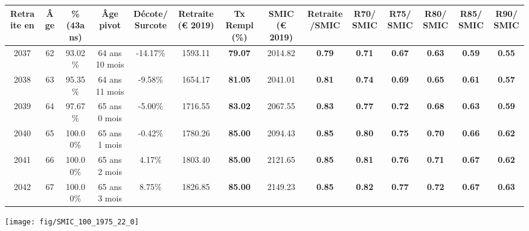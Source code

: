 \begin{adjustbox}{max width=\textwidth} 
\begin{tabular}[htb]{|c|c||c|c|c||c|c||c|c||c|c|c|c|c|} 
\hline 
 Retraite en &  Âge &  \%(43ans) &  Âge pivot &  Décote/Surcote &  Retraite (\euro{} 2019) &  Tx Rempl(\%) &  SMIC (\euro{} 2019) &  Retraite/SMIC &  R70/SMIC &  R75/SMIC &  R80/SMIC &  R85/SMIC &  R90/SMIC \\ 
\hline \hline 
 2037 &  62 &  93.02\% &  64 ans 10 mois &  -14.17\% &  1593.11 &  {\bf 79.07} &  2014.82 &  {\bf {\color{red} 0.79}} &  {\bf {\color{red} 0.71}} &  {\bf {\color{red} 0.67}} &  {\bf {\color{red} 0.63}} &  {\bf {\color{red} 0.59}} &  {\bf {\color{red} 0.55}} \\ 
\hline 
 2038 &  63 &  95.35\% &  64 ans 11 mois &  -9.58\% &  1654.17 &  {\bf 81.05} &  2041.01 &  {\bf {\color{red} 0.81}} &  {\bf {\color{red} 0.74}} &  {\bf {\color{red} 0.69}} &  {\bf {\color{red} 0.65}} &  {\bf {\color{red} 0.61}} &  {\bf {\color{red} 0.57}} \\ 
\hline 
 2039 &  64 &  97.67\% &  65 ans 0 mois &  -5.00\% &  1716.55 &  {\bf 83.02} &  2067.55 &  {\bf {\color{red} 0.83}} &  {\bf {\color{red} 0.77}} &  {\bf {\color{red} 0.72}} &  {\bf {\color{red} 0.68}} &  {\bf {\color{red} 0.63}} &  {\bf {\color{red} 0.59}} \\ 
\hline 
 2040 &  65 &  100.00\% &  65 ans 1 mois &  -0.42\% &  1780.26 &  {\bf 85.00} &  2094.43 &  {\bf {\color{red} 0.85}} &  {\bf {\color{red} 0.80}} &  {\bf {\color{red} 0.75}} &  {\bf {\color{red} 0.70}} &  {\bf {\color{red} 0.66}} &  {\bf {\color{red} 0.62}} \\ 
\hline 
 2041 &  66 &  100.00\% &  65 ans 2 mois &  4.17\% &  1803.40 &  {\bf 85.00} &  2121.65 &  {\bf {\color{red} 0.85}} &  {\bf {\color{red} 0.81}} &  {\bf {\color{red} 0.76}} &  {\bf {\color{red} 0.71}} &  {\bf {\color{red} 0.67}} &  {\bf {\color{red} 0.62}} \\ 
\hline 
 2042 &  67 &  100.00\% &  65 ans 3 mois &  8.75\% &  1826.85 &  {\bf 85.00} &  2149.23 &  {\bf {\color{red} 0.85}} &  {\bf {\color{red} 0.82}} &  {\bf {\color{red} 0.77}} &  {\bf {\color{red} 0.72}} &  {\bf {\color{red} 0.67}} &  {\bf {\color{red} 0.63}} \\ 
\hline 
\hline 
\end{tabular} 
\end{adjustbox} 
 
 \vspace{0.1cm} 

 {\hspace{-2.2cm}\texttt{[image: fig/SMIC\_100\_1975\_22\_0]}} 

